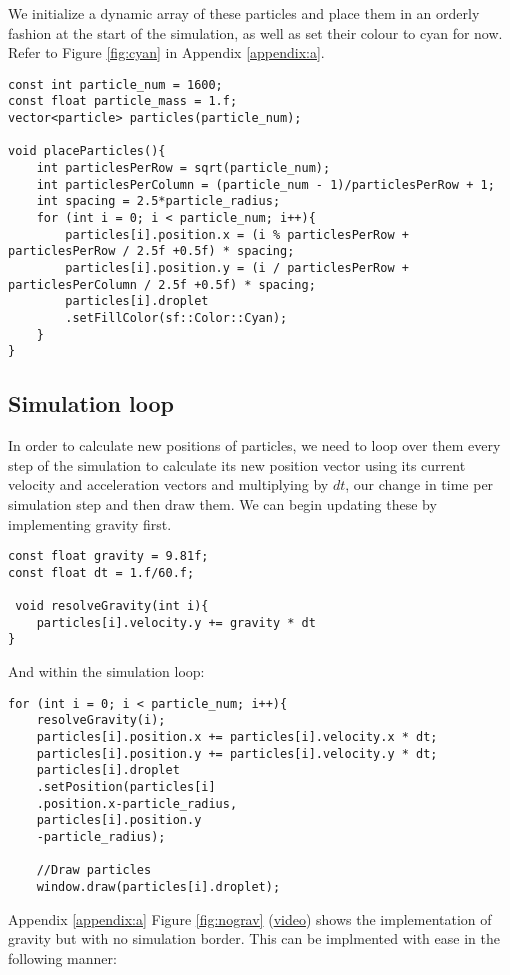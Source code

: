 \documentclass[write-up.tex]{subfiles}
\begin{document}
We initialize a dynamic array of these particles and place them in an orderly fashion at the start of the simulation, as well as set their colour to cyan for now. Refer to Figure \ref{fig:cyan} in Appendix \ref{appendix:a}.

\begin{lstlisting}
const int particle_num = 1600;
const float particle_mass = 1.f;
vector<particle> particles(particle_num);

void placeParticles(){
    int particlesPerRow = sqrt(particle_num);
    int particlesPerColumn = (particle_num - 1)/particlesPerRow + 1;
    int spacing = 2.5*particle_radius;
    for (int i = 0; i < particle_num; i++){
        particles[i].position.x = (i % particlesPerRow + particlesPerRow / 2.5f +0.5f) * spacing;
        particles[i].position.y = (i / particlesPerRow + particlesPerColumn / 2.5f +0.5f) * spacing;
        particles[i].droplet
        .setFillColor(sf::Color::Cyan);
    }
}

\end{lstlisting}

\subsection{Simulation loop}
In order to calculate new positions of particles, we need to loop over them every step of the simulation to calculate its new position vector using its current velocity and acceleration vectors and multiplying by $dt$, our change in time per simulation step and then draw them. We can begin updating these by implementing gravity first.
\begin{lstlisting}
const float gravity = 9.81f;
const float dt = 1.f/60.f;

 void resolveGravity(int i){
    particles[i].velocity.y += gravity * dt
}
\end{lstlisting}

And within the simulation loop:
\begin{lstlisting}
for (int i = 0; i < particle_num; i++){
    resolveGravity(i);
    particles[i].position.x += particles[i].velocity.x * dt;
    particles[i].position.y += particles[i].velocity.y * dt;
    particles[i].droplet
    .setPosition(particles[i]
    .position.x-particle_radius,
    particles[i].position.y
    -particle_radius);

    //Draw particles
    window.draw(particles[i].droplet);
\end{lstlisting}
Appendix \ref{appendix:a} Figure \ref{fig:nograv} (\href{https://youtube.com/shorts/FSuH_Cs1Qh4?feature=share}{video}) shows the implementation of gravity but with no simulation border. This can be implmented with ease in the following manner:
\end{document}

